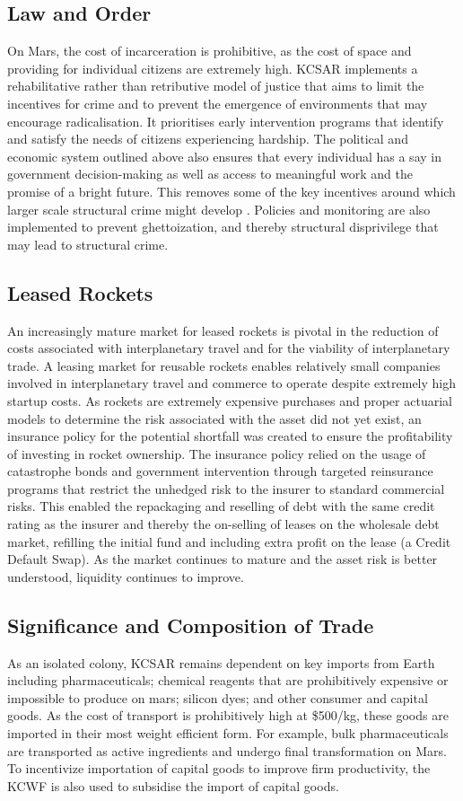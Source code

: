 \documentclass[fleqn,10pt]{Stylesheet} %
\begin{document}
\subsection{Law and Order}
On Mars, the cost of incarceration is prohibitive, as the cost of space and providing for individual citizens are extremely high. KCSAR implements a rehabilitative rather than retributive model of justice that aims to limit the incentives for crime and to prevent the emergence of environments that may encourage radicalisation. It prioritises early intervention programs that identify and satisfy the needs of citizens experiencing hardship. The political and economic system outlined above also ensures that every individual has a say in government decision-making as well as access to meaningful work and the promise of a bright future. This removes some of the key incentives around which larger scale structural crime might develop \cite{10.1093/bjc/azq067}. Policies and monitoring are also implemented to prevent ghettoization, and thereby structural disprivilege that may lead to structural crime. 

\subsection{Leased Rockets}
An increasingly mature market for leased rockets is pivotal in the reduction of costs associated with interplanetary travel and for the viability of interplanetary trade. A leasing market for reusable rockets enables relatively small companies involved in interplanetary travel and commerce to operate despite extremely high startup costs. As rockets are extremely expensive purchases and proper actuarial models to determine the risk associated with the asset did not yet exist, an insurance policy for the potential shortfall was created to ensure the profitability of investing in rocket ownership. The insurance policy relied on the usage of catastrophe bonds and government intervention through targeted reinsurance programs that restrict the unhedged risk to the insurer to standard commercial risks. This enabled the repackaging and reselling of debt with the same credit rating as the insurer and thereby the on-selling of leases on the wholesale debt market, refilling the initial fund and including extra profit on the lease (a Credit Default Swap). As the market continues to mature and the asset risk is better understood, liquidity continues to improve.

\subsection{Significance and Composition of Trade}
As an isolated colony, KCSAR remains dependent on key imports from Earth including pharmaceuticals; chemical reagents that are prohibitively expensive or impossible to produce on mars; silicon dyes; and other consumer and capital goods. As the cost of transport is prohibitively high at \$500/kg, these goods are imported in their most weight efficient form. For example, bulk pharmaceuticals are transported as active ingredients and undergo final transformation on Mars. To incentivize importation of capital goods to improve firm productivity, the KCWF is also used to subsidise the import of capital goods. 
\end{document}
